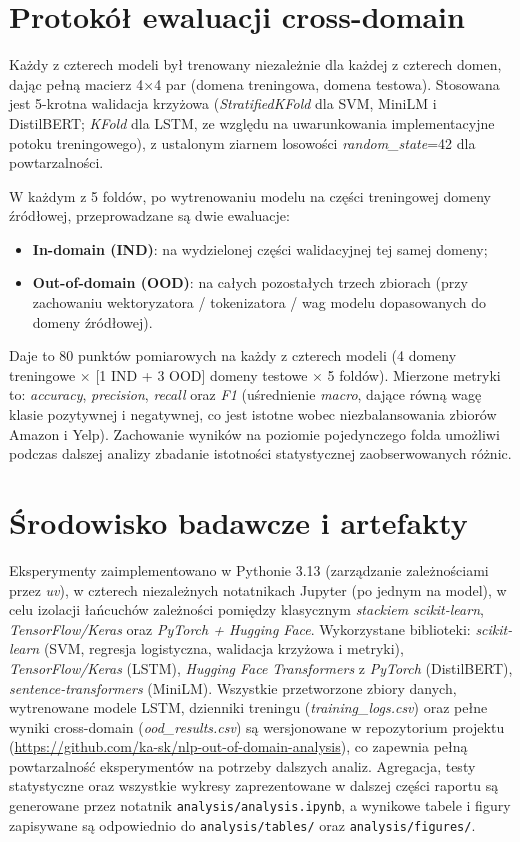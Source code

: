 \documentclass[runningheads]{llncs}
\begin{document}
\section*{Protokół ewaluacji cross-domain}
Każdy z czterech modeli był trenowany niezależnie dla każdej z czterech domen, dając pełną macierz 4$\times$4 par (domena treningowa, domena testowa). Stosowana jest 5-krotna walidacja krzyżowa (\textit{StratifiedKFold} dla SVM, MiniLM i DistilBERT; \textit{KFold} dla LSTM, ze względu na uwarunkowania implementacyjne potoku treningowego), z ustalonym ziarnem losowości \textit{random\_state}=42 dla powtarzalności.

W każdym z 5 foldów, po wytrenowaniu modelu na części treningowej domeny źródłowej, przeprowadzane są dwie ewaluacje:
\begin{itemize}
    \item \textbf{In-domain (IND)}: na wydzielonej części walidacyjnej tej samej domeny;
    \item \textbf{Out-of-domain (OOD)}: na całych pozostałych trzech zbiorach (przy zachowaniu wektoryzatora / tokenizatora / wag modelu dopasowanych do domeny źródłowej).
\end{itemize}
Daje to 80 punktów pomiarowych na każdy z czterech modeli (4 domeny treningowe $\times$ [1 IND + 3 OOD] domeny testowe $\times$ 5 foldów). Mierzone metryki to: \textit{accuracy}, \textit{precision}, \textit{recall} oraz \textit{F1} (uśrednienie \textit{macro}, dające równą wagę klasie pozytywnej i negatywnej, co jest istotne wobec niezbalansowania zbiorów Amazon i Yelp). Zachowanie wyników na poziomie pojedynczego folda umożliwi podczas dalszej analizy zbadanie istotności statystycznej zaobserwowanych różnic.

\section*{Środowisko badawcze i artefakty}
Eksperymenty zaimplementowano w Pythonie 3.13 (zarządzanie zależnościami przez \textit{uv}), w czterech niezależnych notatnikach Jupyter (po jednym na model), w celu izolacji łańcuchów zależności pomiędzy klasycznym \textit{stackiem} \textit{scikit-learn}, \textit{TensorFlow/Keras} oraz \textit{PyTorch + Hugging Face}. Wykorzystane biblioteki: \textit{scikit-learn} (SVM, regresja logistyczna, walidacja krzyżowa i metryki), \textit{TensorFlow/Keras} (LSTM), \textit{Hugging Face Transformers} z \textit{PyTorch} (DistilBERT), \textit{sentence-transformers} (MiniLM). Wszystkie przetworzone zbiory danych, wytrenowane modele LSTM, dzienniki treningu (\textit{training\_logs.csv}) oraz pełne wyniki cross-domain (\textit{ood\_results.csv}) są wersjonowane w repozytorium projektu (\url{https://github.com/ka-sk/nlp-out-of-domain-analysis}), co zapewnia pełną powtarzalność eksperymentów na potrzeby dalszych analiz. Agregacja, testy statystyczne oraz wszystkie wykresy zaprezentowane w dalszej części raportu są generowane przez notatnik \texttt{analysis/analysis.ipynb}, a wynikowe tabele i figury zapisywane są odpowiednio do \texttt{analysis/tables/} oraz \texttt{analysis/figures/}.
\end{document}
